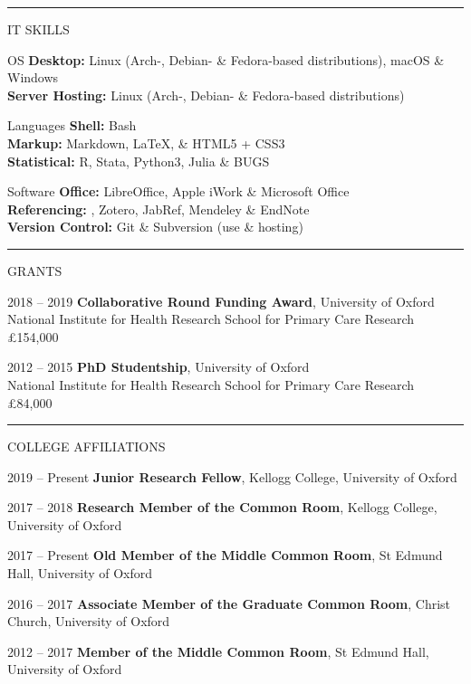 \documentclass[10pt,a4paper]{article}
\begin{document}
\noindent\rule{\textwidth}{0.4pt}
\begin{cvlist}{IT SKILLS}
	
	\item[OS]
	\textbf{Desktop:} Linux (Arch-, Debian- \& Fedora-based distributions), macOS \& Windows \\
	\textbf{Server Hosting:} Linux (Arch-, Debian- \& Fedora-based distributions)
	
	\item[Languages]
	\textbf{Shell:} Bash \\
	\textbf{Markup:} Markdown, \LaTeX , \& HTML5 + CSS3 \\
	\textbf{Statistical:} R, Stata, Python3, Julia \& BUGS
	
	\item[Software]
	\textbf{Office:} LibreOffice, Apple iWork \& Microsoft Office \\
	\textbf{Referencing:} , Zotero, JabRef, Mendeley \& EndNote \\
	\textbf{Version Control:} Git \& Subversion (use \& hosting)
	
\end{cvlist}


\noindent\rule{\textwidth}{0.4pt}
\begin{cvlist}{GRANTS}
	
	\item[2018 -- 2019]
	\textbf{Collaborative Round Funding Award}, University of Oxford \\
	National Institute for Health Research School for Primary Care Research \\
	\pounds 154,000
	
	\item[2012 -- 2015]
	\textbf{PhD Studentship}, University of Oxford \\
	National Institute for Health Research School for Primary Care Research \\
	\pounds 84,000
	
\end{cvlist}


\noindent\rule{\textwidth}{0.4pt}
\begin{cvlist}{COLLEGE AFFILIATIONS}
	
	\item[2019 -- Present]
	\textbf{Junior Research Fellow}, Kellogg College, University of Oxford
	
	\item[2017 -- 2018]
	\textbf{Research Member of the Common Room}, Kellogg College, University of Oxford
	
	\item[2017 -- Present]
	\textbf{Old Member of the Middle Common Room}, St Edmund Hall, University of Oxford
	
	\item[2016 -- 2017]
	\textbf{Associate Member of the Graduate Common Room}, Christ Church, University of Oxford
	
	\item[2012 -- 2017]
	\textbf{Member of the Middle Common Room}, St Edmund Hall, University of Oxford
	
\end{cvlist}
\end{document}
